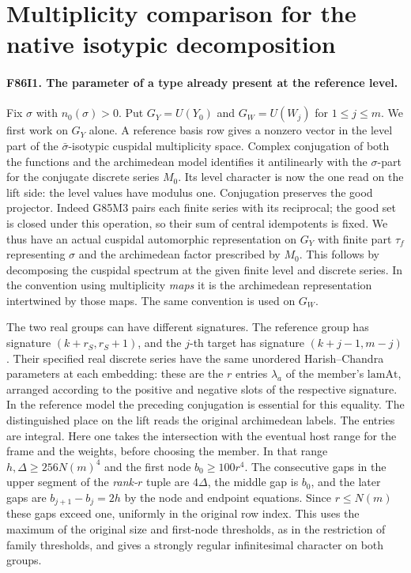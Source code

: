 \section{Multiplicity comparison for the native isotypic decomposition}

\paragraph{F86I1. The parameter of a type already present at the reference level.}
Fix $\sigma$ with $n_0(\sigma)>0$. Put $G_Y=U(Y_0)$ and
$G_W=U(W_j)$ for $1\le j\le m$. We first work on $G_Y$ alone.
A reference basis row gives a nonzero vector in the level part of the
$\bar\sigma$-isotypic cuspidal multiplicity space. Complex conjugation
of both the functions and the archimedean model identifies it
antilinearly with the $\sigma$-part for the conjugate discrete series
$M_0$. Its level character is now the one read on the lift side:
the level values have modulus one. Conjugation preserves the good
projector. Indeed G85M3 pairs each finite series with its
reciprocal; the good set is closed under this operation, so their
sum of central idempotents is fixed. We thus have an actual
cuspidal automorphic representation on $G_Y$ with finite part
$\tau_f$ representing $\sigma$ and the archimedean factor prescribed
by $M_0$. This follows by decomposing the cuspidal spectrum at the
given finite level and discrete series. In the convention using
multiplicity \emph{maps} it is the archimedean representation
intertwined by those maps. The same convention is used on $G_W$.

The two real groups can have different signatures. The reference
group has signature $(k+r_S,r_S+1)$, and the $j$-th target has
signature $(k+j-1,m-j)$. Their specified real discrete series
have the same unordered Harish--Chandra parameters at each
embedding: these are the $r$ entries $\lambda_a$ of the member's
$\mathrm{lamAt}$, arranged according to the positive and negative
slots of the respective signature. In the reference model the
preceding conjugation is essential for this equality. The distinguished
place on the lift reads the original archimedean labels. The entries are integral. Here one takes the intersection with the
eventual host range for the frame and the weights, before choosing
the member. In that range $h,\Delta\ge256N(m)^4$ and the first
node $b_0\ge100r^4$. The consecutive gaps in the upper segment of
the \emph{rank-$r$} tuple are $4\Delta$, the middle gap is $b_0$,
and the later gaps are $b_{j+1}-b_j=2h$ by the node and endpoint
equations. Since $r\le N(m)$ these gaps exceed one, uniformly
in the original row index. This uses the maximum of the original
size and first-node thresholds, as in the restriction of family thresholds, and gives
a strongly regular infinitesimal character on both groups.

